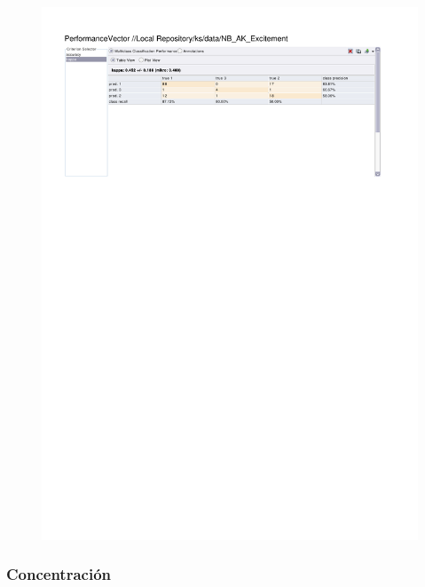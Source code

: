 \begin{figure}[htp]
  \centerline{\includegraphics[trim=0 680 0 60,clip,width=16.09cm]{results/NB_K_Excitement.pdf}} \caption{
} \label{NB_K_Excitement}
\end{figure}

\clearpage
\FloatBarrier
\subsubsection{Concentración}

